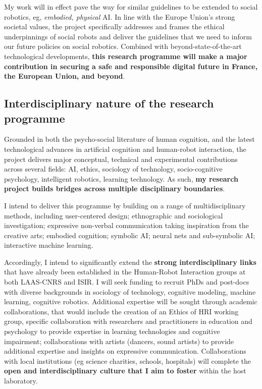 My work will in effect pave the way for similar guidelines to be extended to
social robotics, eg, \emph{embodied, physical} AI. In line with the Europe
Union's strong societal values, the project specifically addresses and frames
the ethical underpinnings of social robots and deliver the guidelines that we
need to inform our future policies on social robotics. Combined with
beyond-state-of-the-art technological developments, \textbf{this research
programme will make a major contribution in securing a safe and responsible
digital future in France, the European Union, and beyond}. 


\subsection{Interdisciplinary nature of the research programme}

Grounded in both the psycho-social literature of human cognition, and the latest
technological advances in artificial cognition and human-robot interaction, the
project delivers major conceptual, technical and experimental contributions
across several fields: AI, ethics, sociology of technology, socio-cognitive
psychology, intelligent robotics, learning technology. As such, \textbf{my
research project builds bridges across multiple disciplinary boundaries}.

I intend to deliver this programme by building on a range of multidisciplinary
methods, including user-centered design; ethnographic and sociological
investigation; expressive non-verbal communication taking inspiration from the
creative arts; embodied cognition; symbolic AI; neural nets and
sub-symbolic AI; interactive machine learning.

Accordingly, I intend to significantly extend the \textbf{strong
interdisciplinary links} that have already been established in the Human-Robot
Interaction groups at both LAAS-CNRS and ISIR. I will seek funding to recruit
PhDs and post-docs with diverse backgrounds in sociology of technology,
cognitive modeling, machine learning, cognitive robotics. Additional expertise
will be sought through academic collaborations, that would include the creation
of an Ethics of HRI working group, specific collaboration with researchers and
practitioners in education and psychology to provide expertise in learning
technologies and cognitive impairment; collaborations with artists (dancers,
sound artists) to provide additional expertise and insights on expressive
communication. Collaborations with local institutions (eg science charities,
schools, hospitals) will complete the \textbf{open and interdisciplinary culture
that I aim to foster} within the host laboratory.


